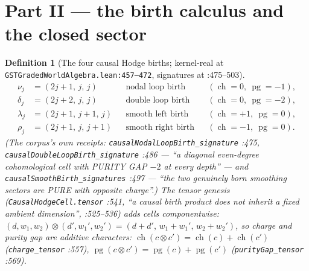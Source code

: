 \documentclass[11pt]{article}
\newtheorem{definition}[theorem]{Definition}
\begin{document}
\section{Part II — the birth calculus and the closed sector}

\begin{definition}[The four causal Hodge births; kernel-real at \texttt{GSTGradedWorldAlgebra.lean:457--472}, signatures at :475--503]
\label{def:births}
\[
\begin{aligned}
\nu_j&=(2j+1,\,j,\,j) &&\text{nodal loop birth} &&(\operatorname{ch}=0,\ \operatorname{pg}=-1),\\
\delta_j&=(2j+2,\,j,\,j) &&\text{double loop birth} &&(\operatorname{ch}=0,\ \operatorname{pg}=-2),\\
\lambda_j&=(2j+1,\,j+1,\,j) &&\text{smooth left birth} &&(\operatorname{ch}=+1,\ \operatorname{pg}=0),\\
\rho_j&=(2j+1,\,j,\,j+1) &&\text{smooth right birth} &&(\operatorname{ch}=-1,\ \operatorname{pg}=0).
\end{aligned}
\]
(The corpus's own receipts: \texttt{causalNodalLoopBirth\_signature} :475, \texttt{causalDoubleLoopBirth\_signature} :486 — ``a diagonal even-degree cohomological cell with PURITY GAP $-2$ at every depth'' — and \texttt{causalSmoothBirth\_signatures} :497 — ``the two genuinely born smoothing sectors are PURE with opposite charge''.)
The tensor genesis (\texttt{CausalHodgeCell.tensor} :541, ``a causal birth product does not inherit a fixed ambient dimension'', :525--536) adds cells componentwise: $(d,w_1,w_2)\otimes(d',w_1',w_2')=(d+d',\,w_1+w_1',\,w_2+w_2')$, so charge and purity gap are \emph{additive characters}: $\operatorname{ch}(c\otimes c')=\operatorname{ch}(c)+\operatorname{ch}(c')$ (\texttt{charge\_tensor} :557), $\operatorname{pg}(c\otimes c')=\operatorname{pg}(c)+\operatorname{pg}(c')$ (\texttt{purityGap\_tensor} :569).
\end{definition}
\end{document}
